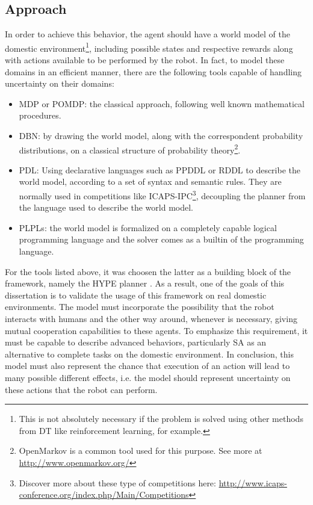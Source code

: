 \subsection{Approach}

In order to achieve this behavior, the agent should have a world model of the
domestic environment\footnote{This is not absolutely necessary if the problem is
solved using other methods from \gls{DT} like reinforcement learning, for example.},
including possible states and respective rewards along with actions available to
be performed by the robot. In fact, to model these domains in an efficient
manner, there are the following tools capable of handling uncertainty on their
domains:
\begin{itemize}
\item \gls{MDP} or \gls{POMDP}: the classical approach, following well known mathematical
procedures.
\item \gls{DBN}: by drawing the world model, along with the correspondent
probability distributions, on a classical structure of probability
theory\footnote{OpenMarkov is a common tool used for this purpose. See more at
\url{http://www.openmarkov.org/}}.
\item \gls{PDL}: Using declarative languages such as \gls{PPDDL}
\cite{younes2004ppddl1} or \gls{RDDL} \cite{Sanner_RDDL} to describe the world
model, according to a set of syntax and semantic rules. They are normally used
in competitions like \gls{ICAPS-IPC}\footnote{Discover more about these type of
competitions here:
\url{http://www.icaps-conference.org/index.php/Main/Competitions}},
decoupling the planner from the language used to describe the world model.
\item \glspl{PLPL}: the world model is formalized on a completely capable
logical programming language and the solver comes as a builtin of the
programming language.
\end{itemize}

For the tools listed above, it was choosen the latter as a building block of
the framework, namely the \gls{HYPE} planner \cite{nitti2015planning}. As a result,
one of the goals of this dissertation is to validate the usage of this
framework on real domestic environments. The model must incorporate the
possibility that the robot interacts with humans and the other way around,
whenever is necessary, giving mutual cooperation capabilities to these agents.
To emphasize this requirement, it must be capable to describe advanced
behaviors, particularly \gls{SA} as an alternative to complete tasks on the
domestic environment.
In conclusion, this model must also represent the chance that execution of an
action will lead to many possible different effects, i.e. the model should
represent uncertainty on these actions that the robot can perform.


